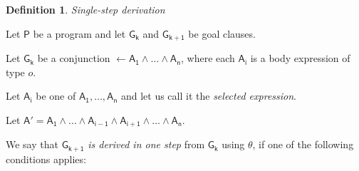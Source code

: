 \documentclass[inscr,ack,preface]{dithesis}
\theoremstyle{definition}
\newtheorem{definition}{Definition}[]
\newcommand{\msf}[1]{$\mathsf{#1}$}
\begin{document}
\begin{definition}{\emph{Single-step derivation}}
\label{def:singlestepderivation}

Let \msf{P} be a program and let \msf{G_{k}} and \msf{G_{k+1}} be goal clauses.

Let \msf{G_{k}} be a conjunction \msf{\leftarrow A_1 \land \dots \land A_n}, where each \msf{A_i} is a body expression of type $o$.

Let \msf{A_i} be one of \msf{A_1, \ldots, A_n} and let us call it the \emph{selected expression}.

Let \msf{A' = A_1 \land \dots \land A_{i-1} \land A_{i+1} \land \dots \land A_n}.

We say that \msf{G_{k+1}} \emph{is derived in one step} from \msf{G_k} using \msf{\theta}, if one of the following conditions applies:


\end{definition}
\end{document}
